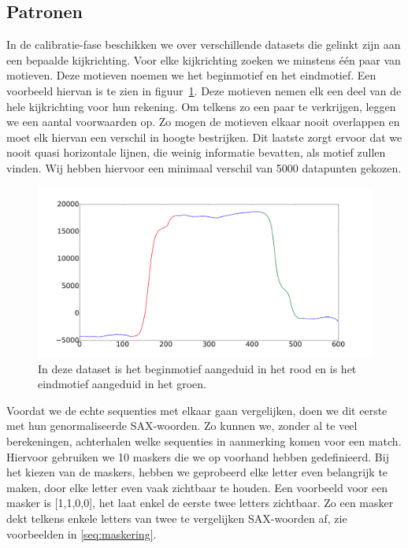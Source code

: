 \documentclass{article}
\begin{document}
\subsection{Patronen}

In de calibratie-fase beschikken we over verschillende datasets die gelinkt zijn aan een bepaalde kijkrichting. Voor elke kijkrichting zoeken we minstens één paar van motieven. Deze motieven noemen we het beginmotief en het eindmotief. Een voorbeeld hiervan is te zien in figuur~\ref{fig:beginend}. Deze motieven nemen elk een deel van de hele kijkrichting voor hun rekening. Om telkens zo een paar te verkrijgen, leggen we een aantal voorwaarden op. Zo mogen de motieven elkaar nooit overlappen en moet elk hiervan een verschil in hoogte bestrijken. Dit laatste zorgt ervoor dat we nooit quasi horizontale lijnen, die weinig informatie bevatten, als motief zullen vinden. Wij hebben hiervoor een minimaal verschil van 5000 datapunten gekozen.

\begin{figure}[h]
\centering
\includegraphics[width=\linewidth]{images/motif_begin_end}
\caption{In deze dataset is het beginmotief aangeduid in het rood en is het eindmotief aangeduid in het groen.}
\label{fig:beginend}
\end{figure}

Voordat we de echte sequenties met elkaar gaan vergelijken, doen we dit eerste met hun genormaliseerde SAX-woorden. Zo kunnen we, zonder al te veel berekeningen, achterhalen welke sequenties in aanmerking komen voor een match. Hiervoor gebruiken we 10 maskers die we op voorhand hebben gedefinieerd. Bij het kiezen van de maskers, hebben we geprobeerd elke letter even belangrijk te maken, door elke letter even vaak zichtbaar te houden. Een voorbeeld voor een masker is [1,1,0,0], het laat enkel de eerste twee letters zichtbaar.  Zo een masker dekt telkens enkele letters van twee te vergelijken SAX-woorden af, zie voorbeelden in \ref{seq:maskering}. 
\end{document}
